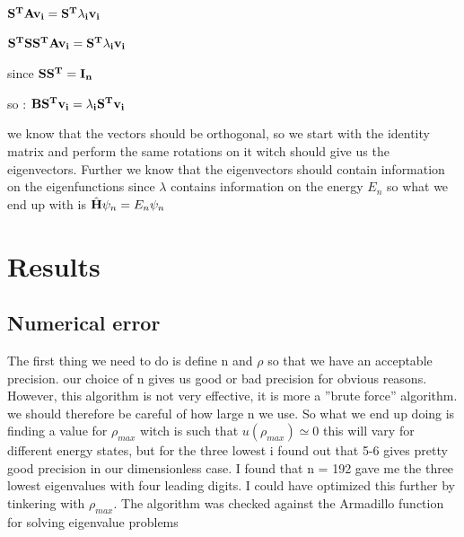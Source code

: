 \documentclass[norsk,a4paper,12pt]{article}
\begin{document}
$\bf{S^T}\bf A v_i = \bf{S^T}\lambda_i v_i$

$\bf{S^T}\bf\bf{S}\bf{S^T} A v_i = \bf{S^T}\lambda_i v_i$

since $\bf{S}\bf{S^T} = \bf{I_n}$

so : $\bf{B}\bf{S^T} v_i = \lambda_i \bf{S^T}v_i$ 

we know that the vectors should be orthogonal, so we start with the identity matrix and perform the same rotations on it
witch should give us the eigenvectors. Further we know that the eigenvectors should contain information on the eigenfunctions
since $\lambda$ contains information on the energy $E_n$ so what we end up with is $\hat{\bf{H}}\psi_n = E_n\psi_n$


\section*{Results}

\subsection*{Numerical error}

The first thing we need to do is define n and $\rho$ so that we have an acceptable precision. our choice of n gives us good or 
bad precision for obvious reasons. However, this algorithm is not very effective, it is more a ''brute force'' algorithm.
we should therefore be careful of how large n we use. So what we end up doing is finding a value for $\rho_{max}$ witch is such 
that $u(\rho_{max}) \simeq 0$ this will vary for different energy states, but for the three lowest i found out that 5-6 
gives pretty good precision in our dimensionless case. I found that n = 192 gave me the three lowest eigenvalues with four leading
digits. I could have optimized this further by tinkering with $\rho_{max}$. The algorithm was checked against the Armadillo function for solving eigenvalue problems 
\end{document}

